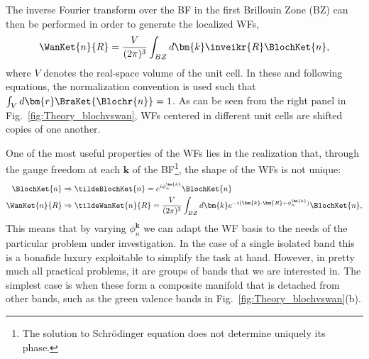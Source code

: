 The inverse Fourier transform over the BF in the first Brillouin Zone (BZ) can then be performed in order to generate the localized WFs,
\begin{equation}
	\label{eq:Theory_wanfourier}
	\WanKet{n}{R} = \frac{V}{(2\pi)^3} \int_{BZ} d \bm{k} \inveikr{R} \BlochKet{n},
\end{equation}
where $V$ denotes the real-space volume of the unit cell.
In these and following equations, the normalization convention is used such that $\int_V d\bm{r}\BraKet{\Blochr{n}} = 1$.
As can be seen from the right panel in Fig.~\ref{fig:Theory_blochvswan}, WFs centered in different unit cells are shifted copies of one another.

One of the most useful properties of the WFs lies in the realization that, through the gauge freedom at each $\bm{k}$ of the BF\footnote{The solution to Schr\"odinger equation does not determine uniquely its phase.}, the shape of the WFs is not unique:
\begin{align}
	\BlochKet{n} &\Rightarrow \tildeBlochKet{n} = e^{i \phi_n^{\bm{k}}} \BlochKet{n} \\
	\WanKet{n}{R} &\Rightarrow \tildeWanKet{n}{R} = \frac{V}{(2\pi)^3} \int_{BZ} d \bm{k} e^{-i (\bm{k} \cdot \bm{R} + \phi_n^{\bm{k}})} \BlochKet{n},
\end{align}
This means that by varying $\phi_n^{\bm{k}}$ we can adapt the WF basis to the needs of the particular problem under investigation.
In the case of a single isolated band this is a bonafide luxury exploitable to simplify the task at hand.
However, in pretty much all practical problems, it are groups of bands that we are interested in.
The simplest case is when these form a composite manifold that is detached from other bands, such as the green valence bands in Fig.~\ref{fig:Theory_blochvswan}(b).

